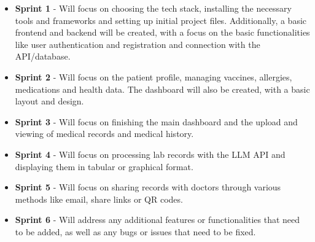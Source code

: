 \begin{itemize}
    \item \textbf{Sprint 1} - Will focus on choosing the tech stack, installing the necessary tools and frameworks and setting up initial project files. Additionally, a basic frontend and backend will be created, with a focus on the basic functionalities like user authentication and registration and connection with the API/database.
    \item \textbf{Sprint 2} - Will focus on the patient profile, managing vaccines, allergies, medications and health data. The dashboard will also be created, with a basic layout and design.
    \item \textbf{Sprint 3} - Will focus on finishing the main dashboard and the upload and viewing of medical records and medical history.
    \item \textbf{Sprint 4} - Will focus on processing lab records with the LLM API and displaying them in tabular or graphical format.
    \item \textbf{Sprint 5} - Will focus on sharing records with doctors through various methods like email, share links or QR codes.
    \item \textbf{Sprint 6} - Will address any additional features or functionalities that need to be added, as well as any bugs or issues that need to be fixed.
\end{itemize}
